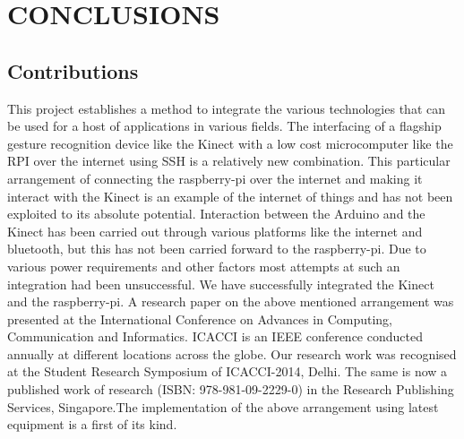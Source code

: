 
\chapter{CONCLUSIONS} %
\section{Contributions}
This project establishes a method to integrate the various technologies that can be used for a host of applications in various fields. The interfacing of a flagship gesture recognition device like the Kinect with a low cost microcomputer like the RPI over the internet using SSH is a relatively new combination. This particular arrangement of connecting the raspberry-pi over the internet and making it interact with the Kinect is an example of the internet of things and has not been exploited to its absolute potential. Interaction between the Arduino and the Kinect has been carried out through various platforms like the internet and bluetooth, but this has not been carried forward to the raspberry-pi. Due to various power requirements and other factors most attempts at such an integration had been unsuccessful. We have successfully integrated the Kinect and the raspberry-pi. A research paper on the above mentioned arrangement was presented at the  International Conference on Advances in Computing, Communication and Informatics. ICACCI is an IEEE conference conducted annually at different locations across the globe. Our research work was recognised at the Student Research Symposium of ICACCI-2014, Delhi. The same is now a published work of research (ISBN: 978-981-09-2229-0) in the Research Publishing Services, Singapore.The implementation of the above arrangement using latest equipment is a first of its kind. 

